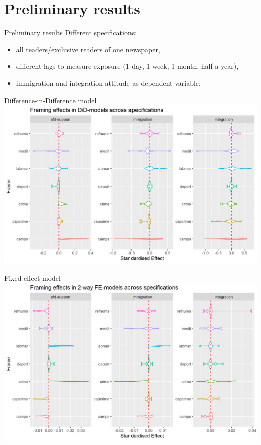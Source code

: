 \documentclass[
  ignorenonframetext,
]{beamer}
\providecommand{\tightlist}{%
  \setlength{\itemsep}{0pt}\setlength{\parskip}{0pt}}
\begin{document}
\hypertarget{preliminary-results}{%
\section{Preliminary results}\label{preliminary-results}}

\begin{frame}{Preliminary results}
Different specifications:

\begin{itemize}
\tightlist
\item
  all readers/exclusive readers of one newspaper,
\item
  different lags to measure exposure (1 day, 1 week, 1 month, half a
  year),
\item
  immigration and integration attitude as dependent variable.
\end{itemize}
\end{frame}

\begin{frame}[allowframebreaks]{Difference-in-Difference model}
\protect\hypertarget{difference-in-difference-model}{}
\includegraphics{vis/frame_effects_did.png}
\end{frame}

\begin{frame}{Fixed-effect model}
\protect\hypertarget{fixed-effect-model}{}
\includegraphics{vis/frame_effects_fe.png}
\end{frame}
\end{document}
